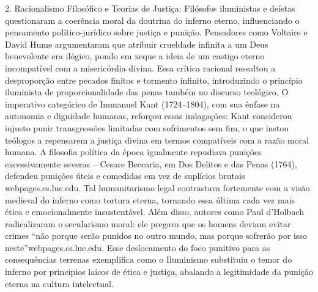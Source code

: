 2. Racionalismo Filosófico e Teorias de Justiça: Filósofos iluministas e deístas questionaram a coerência moral da doutrina do inferno eterno, influenciando o pensamento político-jurídico sobre justiça e punição. Pensadores como Voltaire e David Hume argumentaram que atribuir crueldade infinita a um Deus benevolente era ilógico, pondo em xeque a ideia de um castigo eterno incompatível com a misericórdia divina. Essa crítica racional ressaltou a desproporção entre pecados finitos e tormento infinito, introduzindo o princípio iluminista de proporcionalidade das penas também no discurso teológico. O imperativo categórico de Immanuel Kant (1724--1804), com sua ênfase na autonomia e dignidade humanas, reforçou essas indagações: Kant considerou injusto punir transgressões limitadas com sofrimentos sem fim, o que instou teólogos a repensarem a justiça divina em termos compatíveis com a razão moral humana. A filosofia política da época igualmente repudiava punições excessivamente severas -- Cesare Beccaria, em Dos Delitos e das Penas (1764), defendeu punições úteis e comedidas em vez de suplícios brutais webpages.cs.luc.edu. Tal humanitarismo legal contrastava fortemente com a visão medieval do inferno como tortura eterna, tornando essa última cada vez mais ética e emocionalmente insustentável. Além disso, autores como Paul d’Holbach radicalizaram o secularismo moral: ele pregava que os homens deviam evitar crimes “não porque serão punidos no outro mundo, mas porque sofrerão por isso neste”webpages.cs.luc.edu. Esse deslocamento do foco punitivo para as consequências terrenas exemplifica como o Iluminismo substituiu o temor do inferno por princípios laicos de ética e justiça, abalando a legitimidade da punição eterna na cultura intelectual.

